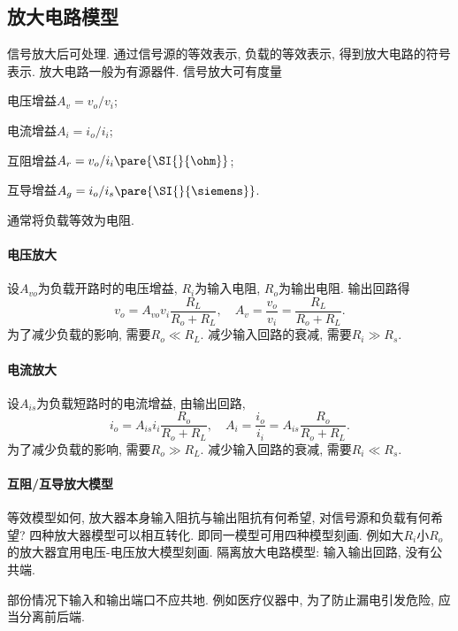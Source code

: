 \documentclass[hidelinks]{ctexart}
\begin{document}

\subsection{放大电路模型} %
\label{sub:放大电路模型}

\newpoint{}信号放大后可处理.
\newpoint{}通过信号源的等效表示, 负载的等效表示, 得到放大电路的符号表示. 放大电路一般为有源器件.
\newpoint{}信号放大可有度量
\begin{cenum}
    \item 电压增益$A_v = v_o / v_i$;
    \item 电流增益$A_i = i_o / i_i$;
    \item 互阻增益$A_r = v_o / i_i\pare{\SI{}{\ohm}}$;
    \item 互导增益$A_g = i_o / i_s\pare{\SI{}{\siemens}}$.
\end{cenum}
\newpoint{}通常将负载等效为电阻.
\paragraph{电压放大} %
\label{par:电压放大}

设$A_{vo}$为负载开路时的电压增益, $R_i$为输入电阻, $R_o$为输出电阻. 输出回路得
\[ v_o = A_{vo}v_i \frac{R_L}{R_o + R_L},\quad A_v = \frac{v_o}{v_i} = \frac{R_L}{R_o+R_L}. \]
为了减少负载的影响, 需要$R_o \ll R_L$. 减少输入回路的衰减, 需要$R_i \gg R_s$.


\paragraph{电流放大} %
\label{par:电流放大}

设$A_{is}$为负载短路时的电流增益, 由输出回路,
\[ i_o = A_{is}i_i \frac{R_o}{R_o + R_L},\quad A_i = \frac{i_o}{i_i} = A_{is}\frac{R_o}{R_o+R_L}. \]
为了减少负载的影响, 需要$R_o \gg R_L$. 减少输入回路的衰减, 需要$R_i \ll R_s$.


\paragraph{互阻/互导放大模型} %
\label{par:互阻_互导放大模型}

等效模型如何, 放大器本身输入阻抗与输出阻抗有何希望, 对信号源和负载有何希望?
\newpoint{}四种放大器模型可以相互转化. 即同一模型可用四种模型刻画. 例如大$R_i$小$R_o$的放大器宜用电压-电压放大模型刻画.
\newpoint{}隔离放大电路模型: 输入输出回路, 没有公共端.
\begin{ex}
    部份情况下输入和输出端口不应共地. 例如医疗仪器中, 为了防止漏电引发危险, 应当分离前后端.
\end{ex}
\end{document}
